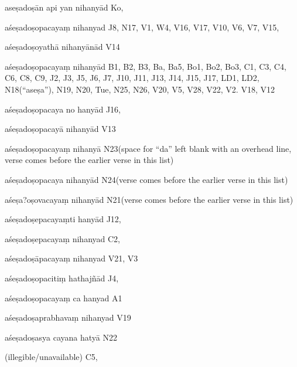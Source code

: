 \begin{ekdosis}
\begin{marma}[hp01_055]
\begin{marma}[hp02_009]
\begin{marma}[hp02_011]
\begin{marma}[hp02_29c]
\item[aseṣadoṣān api yan nihanyād] Ko, 
\item[aśeṣadoṣopacayaṃ nihanyad] J8, N17, V1, W4, V16, V17, V10, V6, V7, V15, 
\item[aśeṣadoṣoyathā nihanyānād] V14
\item[aśeṣadoṣopacayaṃ nihanyād] B1, B2, B3, Ba, Ba5, Bo1, Bo2, Bo3, C1, C3, C4, C6, C8, C9, J2, J3, J5, J6, J7, J10, J11, J13, J14, J15, J17, LD1, LD2, N18(“aseṣa”), N19, N20, Tue, N25, N26, V20, V5, V28, V22, V2. V18, V12
\item[aśeṣadoṣopacaya no hanyād] J16,
\item[aśeṣadoṣopacayā nihanyād] V13
\item[aśeṣadoṣopacayaṃ nihanyā] N23(space for “da” left blank with an overhead line, verse comes before the earlier verse in this list)
\item[aśeṣadoṣopacaya nihanyād] N24(verse comes before the earlier verse in this list)
\item[aśeṣa?oṣovacayaṃ nihanyād] N21(verse comes before the earlier verse in this list)
\item[aśeṣadoṣepacayaṃti hanyād] J12,
\item[aśeṣadoṣepacayaṃ nihanyad] C2,
\item[aśeṣadoṣāpacayaṃ nihanyad] V21, V3
\item[aśeṣadoṣopacitiṃ hathajñād] J4,
\item[aśeṣadoṣopacayaṃ ca hanyad] A1
\item[aśeṣadoṣaprabhavaṃ nihanyad] V19
\item[aśeṣadoṣasya cayana hatyā] N22
\item[(illegible/unavailable)] C5,
 \begin{description}

        \end{description}
\end{marma}


\end{marma}
\end{marma}
\end{marma}
\end{ekdosis}
